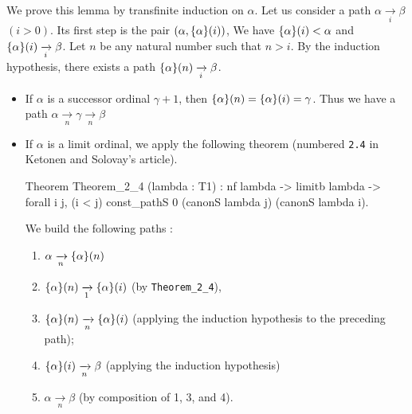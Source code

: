 \documentclass[a4paper]{book}
\begin{document}
We prove this lemma by transfinite induction on $\alpha$.
Let us consider a path $\alpha \xrightarrow [i]{} \beta$ $(i>0)$. Its first step is
the pair $(\alpha,\mbox{$\{\alpha\}(i)$})$, We have $\mbox{$\{\alpha\}(i)$}<\alpha$ and
$\mbox{$\{\alpha\}(i)$} \xrightarrow [i]{} \beta$. 
Let $n$ be any natural number such that $n>i$.
By the induction hypothesis, there exists a path $\mbox{$\{\alpha\}(n)$} \xrightarrow[i]{} \beta$.
\begin{itemize}
\item  If $\alpha$ is a successor ordinal $\gamma+1$, then $\mbox{$\{\alpha\}(n)$} =
\mbox{$\{\alpha\}(i)$}=\gamma$. Thus we have a path 
$\alpha  \xrightarrow [n]{}  \gamma \xrightarrow [n]{} \beta$
\item If $\alpha$ is a limit ordinal, we apply the following theorem (numbered \texttt{2.4} in Ketonen and Solovay's article). 



  \begin{Coqsrc}
Theorem Theorem_2_4 (lambda : T1) :
   nf lambda ->
   limitb lambda  ->
   forall i j, (i < j)%
               const_pathS 0 (canonS lambda j)
                             (canonS lambda i). 
  \end{Coqsrc}

 We build the following paths :

 \begin{enumerate}
 \item $\alpha \xrightarrow[n]{} \mbox{$\{\alpha\}(n)$}$
 \item $\mbox{$\{\alpha\}(n)$} \xrightarrow[1]{} \mbox{$\{\alpha\}(i)$}$ (by \texttt{Theorem\_2\_4}),
\item $\mbox{$\{\alpha\}(n)$} \xrightarrow[n]{} \mbox{$\{\alpha\}(i)$}$ (applying the induction hypothesis to the preceding path);
\item $\mbox{$\{\alpha\}(i)$} \xrightarrow[n]{} \beta$ (applying the induction hypothesis)\item $\alpha \xrightarrow[n]{} \beta$ (by composition of 1, 3, and 4).


 \end{enumerate}


\end{itemize}
\end{document}
